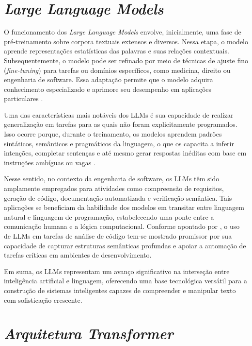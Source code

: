 \FloatBarrier
\section{\textit{Large Language Models}}

O funcionamento dos \textit{Large Language Models} envolve, inicialmente, uma fase de pré-treinamento sobre corpora textuais extensos e diversos. Nessa etapa, o modelo aprende representações estatísticas das palavras e suas relações contextuais. Subsequentemente, o modelo pode ser refinado por meio de técnicas de ajuste fino (\textit{fine-tuning}) para tarefas ou domínios específicos, como medicina, direito ou engenharia de software. Essa adaptação permite que o modelo adquira conhecimento especializado e aprimore seu desempenho em aplicações particulares \cite{jelodar2025, ouyang2023}.

Uma das características mais notáveis dos LLMs é sua capacidade de realizar generalização em tarefas para as quais não foram explicitamente programados. Isso ocorre porque, durante o treinamento, os modelos aprendem padrões sintáticos, semânticos e pragmáticos da linguagem, o que os capacita a inferir intenções, completar sentenças e até mesmo gerar respostas inéditas com base em instruções ambíguas ou vagas \cite{liu2024hallucinations, fan2023llmsw}.

Nesse sentido, no contexto da engenharia de software, os LLMs têm sido amplamente empregados para atividades como compreensão de requisitos, geração de código, documentação automatizada e verificação semântica. Tais aplicações se beneficiam da habilidade dos modelos em transitar entre linguagem natural e linguagem de programação, estabelecendo uma ponte entre a comunicação humana e a lógica computacional. Conforme apontado por , o uso de LLMs em tarefas de análise de código tem-se mostrado promissor por sua capacidade de capturar estruturas semânticas profundas e apoiar a automação de tarefas críticas em ambientes de desenvolvimento.

Em suma, os LLMs representam um avanço significativo na interseção entre inteligência artificial e linguagem, oferecendo uma base tecnológica versátil para a construção de sistemas inteligentes capazes de compreender e manipular texto com sofisticação crescente.

\section{\textit{Arquitetura Transformer}}

